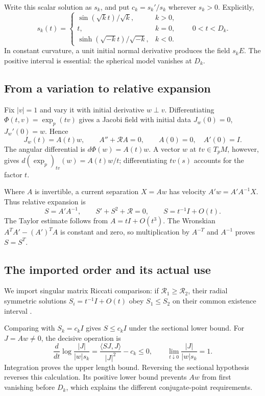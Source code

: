 \documentclass[12pt,reqno]{amsart}
\begin{document}
Write this scalar solution as \(s_k\), and put \(c_k=s_k'/s_k\) wherever \(s_k>0\). Explicitly,
\[
s_k(t)=\begin{cases}
\sin(\sqrt{k}t)/\sqrt{k},&k>0,\\
t,&k=0,\\
\sinh(\sqrt{-k}t)/\sqrt{-k},&k<0.
\end{cases}
\qquad 0<t<D_k.
\]
In constant curvature, a unit initial normal derivative produces the field \(s_kE\). The positive interval is essential: the spherical model vanishes at \(D_k\).

\subsection*{From a variation to relative expansion}
Fix \(|v|=1\) and vary it with initial derivative \(w\perp v\). Differentiating \(\Phi(t,v)=\exp_p(tv)\) gives a Jacobi field with initial data \(J_w(0)=0\), \(J_w'(0)=w\). Hence
\[
J_w(t)=A(t)w,\qquad A''+\mathcal RA=0,\qquad A(0)=0,\quad A'(0)=I.
\]
The angular differential is \(d\Phi(w)=A(t)w\). A vector \(w\) at \(tv\in T_pM\), however, gives \(d(\exp_p)_{tv}(w)=A(t)w/t\); differentiating \(tv(s)\) accounts for the factor \(t\).

Where \(A\) is invertible, a current separation \(X=Aw\) has velocity \(A'w=A'A^{-1}X\). Thus relative expansion is
\[
S=A'A^{-1},\qquad S'+S^2+\mathcal R=0,\qquad S=t^{-1}I+O(t).
\]
The Taylor estimate follows from \(A=tI+O(t^3)\). The Wronskian \(A^TA'-(A')^TA\) is constant and zero, so multiplication by \(A^{-T}\) and \(A^{-1}\) proves \(S=S^T\).

\subsection*{The imported order and its actual use}
We import singular matrix Riccati comparison: if \(\mathcal R_1\ge\mathcal R_2\), their radial symmetric solutions \(S_i=t^{-1}I+O(t)\) obey \(S_1\le S_2\) on their common existence interval \cite[Remark 3.2]{S-Eschenburg-1994}.

Comparing with \(S_k=c_kI\) gives \(S\le c_kI\) under the sectional lower bound. For \(J=Aw\ne0\), the decisive operation is
\[
\frac d{dt}\log\frac{|J|}{|w|s_k}
=\frac{\langle SJ,J\rangle}{|J|^2}-c_k\le0,
\qquad \lim_{t\downarrow0}\frac{|J|}{|w|s_k}=1.
\]
Integration proves the upper length bound. Reversing the sectional hypothesis reverses this calculation. Its positive lower bound prevents \(Aw\) from first vanishing before \(D_k\), which explains the different conjugate-point requirements.
\end{document}
